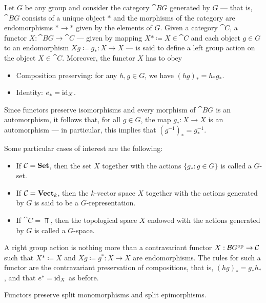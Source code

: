 \begin{example}\label{exp:grp-action}
Let \(G\) be any group and consider the category \(\cat{B}G\) generated by \(G\)
--- that is, \(\cat BG\) consists of a unique object \(*\) and the morphisms of
the category are endomorphisms \(* \to *\) given by the elements of \(G\). Given
a category \(\cat C\), a functor \(X: \cat BG \to \cat C\) --- given by mapping
\(X* \coloneq X \in \cat C\) and each object \(g \in G\) to an endomorphism \(Xg
\coloneq g_{*}: X \to X\) --- is said to define a left group action on the
object \(X \in \cat C\). Moreover, the functor \(X\) has to obey
\begin{itemize}\setlength\itemsep{0em}
\item Composition preserving: for any \(h, g \in G\), we have \((h g)_{*} =
  h_{*} g_{*}\).
\item Identity: \(e_{*} = \operatorname{id}_X\).
\end{itemize}
Since functors preserve isomorphisms and every morphism of \(\cat BG\) is an
automorphism, it follows that, for all \(g \in G\), the map \(g_{*}: X \to X\)
is an automorphism --- in particular, this implies that \((g^{-1})_{*} =
g_{*}^{-1}\).

Some particular cases of interest are the following:
\begin{itemize}\setlength\itemsep{0em}
\item If \(\mathcal C = {\textbf{Set}}\), then the set \(X\) together with the actions
  \(\{g_{*} : g \in G\}\) is called a \(G\)-set.
\item If \(\mathcal C = {\textbf{Vect}}_k\), then the \(k\)-vector space \(X\) together with
  the actions generated by \(G\) is said to be a \(G\)-representation.
\item If \(\cat C = \Top\), then the topological space \(X\) endowed with the
  actions generated by \(G\) is called a \(G\)-space.
\end{itemize}

A right group action is nothing more than a contravariant functor \(X: \mathcal
BG^{\mathrm{op}} \to \mathcal C\) such that \(X* \coloneq X\) and \(Xg \coloneq g^{*}: X \to
X\) are endomorphisms. The rules for such a functor are the contravariant
preservation of compositions, that is, \((h g)_{*} = g_{*} h_{*}\), and that
\(e^{*} = \operatorname{id}_X\) as before.
\end{example}

\begin{lemma}\label{lem: func-preserve-split}
Functors preserve split monomorphisms and split epimorphisms.
\end{lemma}

